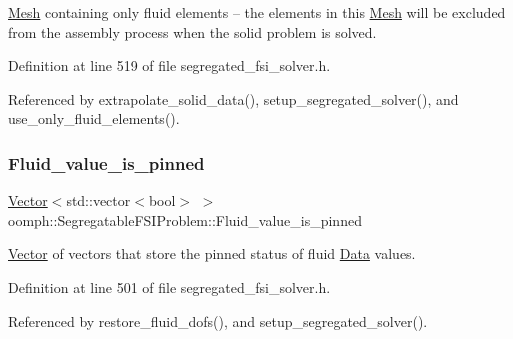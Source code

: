 \hyperlink{classoomph_1_1Mesh}{Mesh} containing only fluid elements -- the elements in this \hyperlink{classoomph_1_1Mesh}{Mesh} will be excluded from the assembly process when the solid problem is solved. 



Definition at line 519 of file segregated\+\_\+fsi\+\_\+solver.\+h.



Referenced by extrapolate\+\_\+solid\+\_\+data(), setup\+\_\+segregated\+\_\+solver(), and use\+\_\+only\+\_\+fluid\+\_\+elements().

\mbox{\label{classoomph_1_1SegregatableFSIProblem_aa39b7f8499588b28b9b490771c4bcff2}} 
\subsubsection{\texorpdfstring{Fluid\+\_\+value\+\_\+is\+\_\+pinned}{Fluid\_value\_is\_pinned}}
{\footnotesize\ttfamily \hyperlink{classoomph_1_1Vector}{Vector}$<$std\+::vector$<$bool$>$ $>$ oomph\+::\+Segregatable\+F\+S\+I\+Problem\+::\+Fluid\+\_\+value\+\_\+is\+\_\+pinned\hspace{0.3cm}{\ttfamily [protected]}}



\hyperlink{classoomph_1_1Vector}{Vector} of vectors that store the pinned status of fluid \hyperlink{classoomph_1_1Data}{Data} values. 



Definition at line 501 of file segregated\+\_\+fsi\+\_\+solver.\+h.



Referenced by restore\+\_\+fluid\+\_\+dofs(), and setup\+\_\+segregated\+\_\+solver().

\mbox{\label{classoomph_1_1SegregatableFSIProblem_aa2a06cb9517d1f183cdbaa20ea077805}} 
